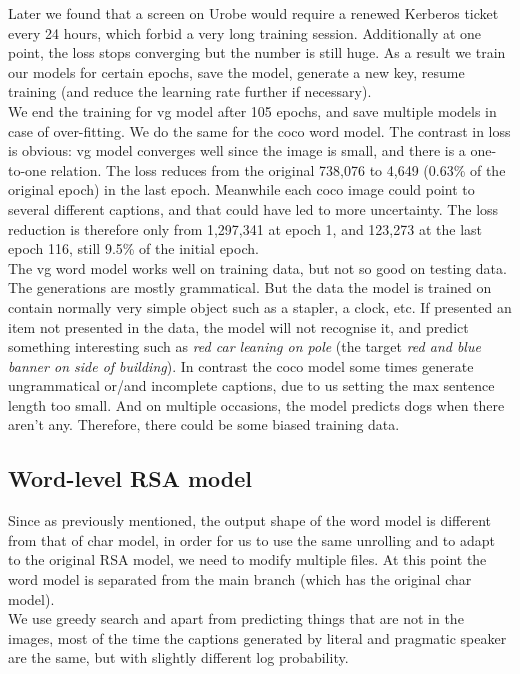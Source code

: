 \documentclass[a4paper]{scrartcl}
\begin{document}
Later we found that a screen on Urobe would require a renewed Kerberos ticket every 24 hours, which forbid a very long training session. Additionally at one point, the loss stops converging but the number is still huge. As a result we train our models for certain epochs, save the model, generate a new key, resume training (and reduce the learning rate further if necessary). \\

We end the training for vg model after 105 epochs, and save multiple models in case of over-fitting. We do the same for the coco word model. The contrast in loss is obvious: vg model converges well since the image is small, and there is a one-to-one relation. The loss reduces from the original 738,076 to 4,649 (0.63\% of the original epoch) in the last epoch. Meanwhile each coco image could point to several different captions, and that could have led to more uncertainty. The loss reduction is therefore only from 1,297,341 at epoch 1, and 123,273 at the last epoch 116, still 9.5\% of the initial epoch.\\

The vg word model works well on training data, but not so good on testing data. The generations are mostly grammatical. But the data the model is trained on contain normally very simple object such as a stapler, a clock, etc. If presented an item not presented in the data, the model will not recognise it, and predict something interesting such as \emph{red car leaning on pole} (the target \emph{red and blue banner on side of building}). In contrast the coco model some times generate ungrammatical or/and incomplete captions, due to us setting the max sentence length too small. And on multiple occasions, the model predicts dogs when there aren't any. Therefore, there could be some biased training data.  
\subsection*{Word-level RSA model}
Since as previously mentioned, the output shape of the word model is different from that of char model, in order for us to use the same unrolling and to adapt to the original RSA model, we need to modify multiple files. At this point the word model is separated from the main branch (which has the original char model). \\

We use greedy search and apart from predicting things that are not in the images, most of the time the captions generated by literal and pragmatic speaker are the same, but with slightly different log probability. 
\end{document}
